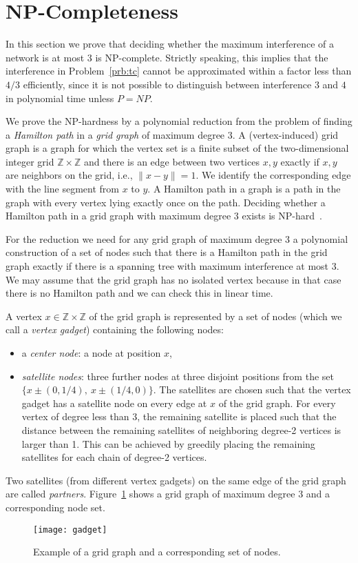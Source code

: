 \documentclass{article}
\theoremstyle{plain}
\theoremstyle{definition}
\theoremstyle{remark}
\begin{document}
\section{NP-Completeness}
In this section we prove that deciding whether the maximum interference
of a network is at most $3$ is NP-complete. Strictly speaking, this
implies that the interference in Problem~\ref{prb:tc} cannot be
approximated within a factor less than $4/3$ efficiently, since
it is not possible to distinguish between interference $3$ and $4$ in
polynomial time unless $P=NP$.

We prove the NP-hardness by a polynomial reduction from the problem of finding a \emph{Hamilton path} in a
\emph{grid graph} of maximum degree $3$. A (vertex-induced) grid graph is a graph for which the vertex set is a finite subset of
the two-dimensional integer grid $\mathbb{Z} \times \mathbb{Z}$ and there is an edge between two
vertices $x,y$ exactly if $x,y$ are neighbors on the grid, i.e., $\|x-y\| = 1$. We identify the corresponding
edge with the line segment from $x$ to $y$.
A Hamilton path in
a graph is a path in the graph with every vertex lying exactly once on the path. Deciding whether a Hamilton
path in a grid graph with maximum degree $3$ exists is NP-hard~\cite{pv-tgp-84}.

For the reduction we need for any grid graph of maximum degree $3$ a polynomial construction of a set of nodes such that
there is a Hamilton path in the grid graph exactly if there is a spanning tree with maximum interference at most $3$.
We may assume that the grid graph has no isolated vertex because in that case there is no Hamilton path and
we can check this in linear time.

A vertex $x\in\mathbb{Z}\times\mathbb{Z}$ of the grid graph is represented by a set of nodes
(which we call a \emph{vertex gadget}) containing the following nodes:
\begin{itemize}
\item a \emph{center node}: a node at position $x$,
\item \emph{satellite nodes}: three further nodes at three disjoint positions from the set $\{x\pm (0,1/4),\ x\pm (1/4,0)\}$. The
satellites are chosen such that the vertex gadget has a satellite node on every edge at $x$ of the
grid graph. For every vertex of degree less than 3, the remaining satellite is placed such that the distance between the remaining satellites of neighboring degree-2 vertices is larger than 1. This can be achieved by greedily placing the remaining satellites for each chain of degree-2 vertices.
\end{itemize}
Two satellites (from different vertex gadgets) on the same edge of the grid graph are called
\emph{partners}. Figure~\ref{fig:gadget} shows a grid graph of maximum degree $3$ and a
corresponding node set.
\begin{figure}
  \centering
  \texttt{[image: gadget]}
  \caption{Example of a grid graph and a corresponding set of nodes.}
  \label{fig:gadget}
\end{figure}
\end{document}
